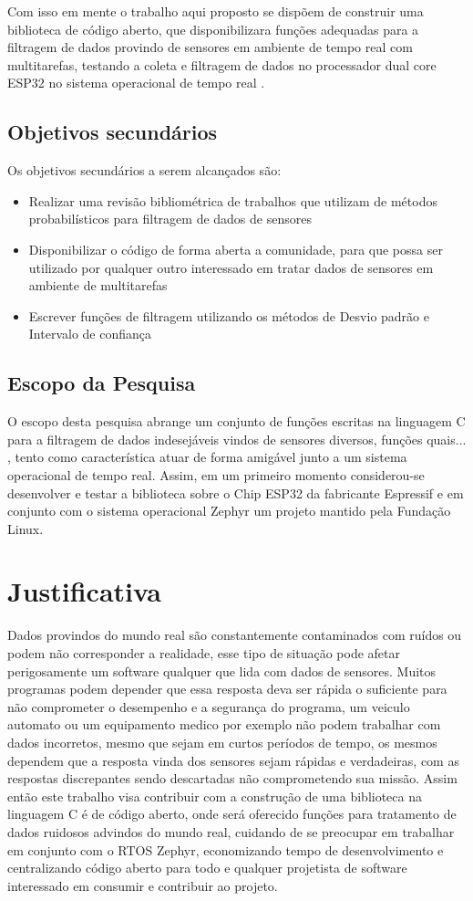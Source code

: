 Com isso em mente o trabalho aqui proposto se dispõem de construir uma biblioteca de código aberto, que disponibilizara funções adequadas para a filtragem de dados provindo de sensores em ambiente de tempo real com multitarefas, testando a coleta e filtragem de dados no processador dual core ESP32 no sistema operacional de tempo real \cite{Zephyr}.

\subsection{Objetivos secundários}
Os objetivos secundários a serem alcançados são:
\begin{itemize}
\item Realizar uma revisão bibliométrica de trabalhos que utilizam de métodos probabilísticos para filtragem de dados de sensores
\item Disponibilizar o código de forma aberta a comunidade, para que possa ser utilizado por qualquer outro interessado em tratar dados de sensores em ambiente de multitarefas
\item Escrever funções de filtragem utilizando os métodos de Desvio padrão e Intervalo de confiança
\end{itemize}


\subsection{Escopo da Pesquisa}
O escopo desta pesquisa abrange um conjunto de funções escritas na linguagem C para a filtragem de dados indesejáveis vindos de sensores diversos, funções quais... %
, tento como característica atuar de forma amigável junto a um sistema operacional de tempo real. Assim, em um primeiro momento considerou-se desenvolver e testar a biblioteca sobre o Chip ESP32 da fabricante Espressif e em conjunto com o sistema operacional Zephyr um projeto mantido pela Fundação Linux.  


\section{Justificativa}
Dados provindos do mundo real são constantemente contaminados com ruídos ou podem não corresponder a realidade, esse tipo de situação pode afetar perigosamente um software qualquer que lida com dados de sensores. Muitos programas podem depender que essa resposta deva ser rápida o suficiente para não comprometer o desempenho e a segurança do programa, um veiculo automato ou um equipamento medico por exemplo não podem trabalhar com dados incorretos, mesmo que sejam em curtos períodos de tempo, os mesmos dependem que a resposta vinda dos sensores sejam rápidas e verdadeiras, com as respostas discrepantes sendo descartadas não comprometendo sua missão. 
Assim então este trabalho visa contribuir com a construção de uma biblioteca na linguagem C é de código aberto, onde será oferecido funções para tratamento de dados ruidosos advindos do mundo real, cuidando de se preocupar em trabalhar em conjunto com o RTOS Zephyr, economizando tempo de desenvolvimento e centralizando código aberto para todo e qualquer projetista de software interessado em consumir e contribuir ao projeto.



